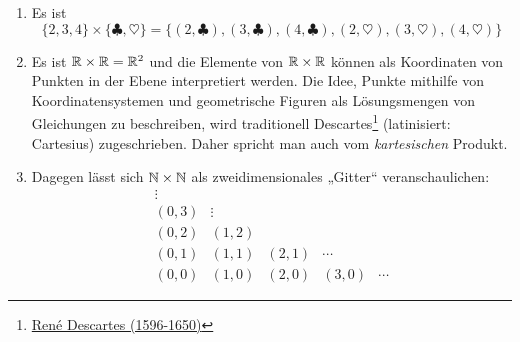 \begin{bsp} \quad
    \begin{enumerate}
        \item Es ist
            \[ \{2,3,4\}\times \{ \clubsuit,\heartsuit\} = \{ (2,\clubsuit), (3,\clubsuit), (4,\clubsuit), (2,\heartsuit), (3,\heartsuit), (4,\heartsuit) \}\]
        \item Es ist $\mathbb R\times \mathbb R=\mathbb R^2$ und die Elemente von $\mathbb R\times \mathbb R$ können als Koordinaten von Punkten in der Ebene interpretiert werden. Die Idee, Punkte mithilfe von Koordinatensystemen und geometrische Figuren als Lösungsmengen von Gleichungen zu beschreiben, wird traditionell Descartes\footnote{\href{https://de.wikipedia.org/wiki/Rene_Descartes}{René Descartes (1596-1650)}} (latinisiert: Cartesius) zugeschrieben. Daher spricht man auch vom \emph{kartesischen} Produkt.
        \item Dagegen lässt sich $\mathbb N\times\mathbb N$ als zweidimensionales „Gitter“ veranschaulichen:
            \[ \begin{matrix}
                \vdots &&&& \\
                (0,3) & \vdots &&& \\
                (0,2) & (1,2) &&& \\
                (0,1) & (1,1) & (2,1) & \cdots & \\
                (0,0) & (1,0) & (2,0) & (3,0) & \cdots
            \end{matrix} \]
    \end{enumerate}
\end{bsp}



